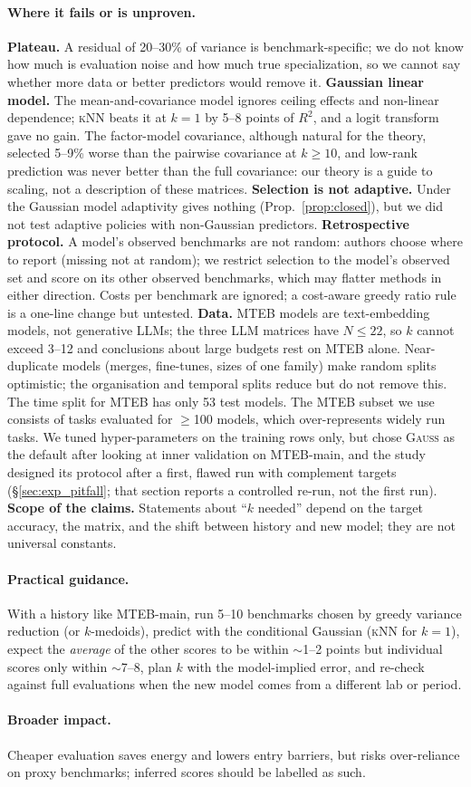 \paragraph{Where it fails or is unproven.}
\textbf{Plateau.} A residual of 20--30\% of variance is benchmark-specific; we do not know how much is evaluation noise and how much true specialization, so we cannot say whether more data or better predictors would remove it. \textbf{Gaussian linear model.} The mean-and-covariance model ignores ceiling effects and non-linear dependence; \textsc{kNN} beats it at $k=1$ by 5--8 points of $R^2$, and a logit transform gave no gain. The factor-model covariance, although natural for the theory, selected 5--9\% worse than the pairwise covariance at $k\ge10$, and low-rank prediction was never better than the full covariance: our theory is a guide to scaling, not a description of these matrices. \textbf{Selection is not adaptive.} Under the Gaussian model adaptivity gives nothing (Prop.~\ref{prop:closed}), but we did not test adaptive policies with non-Gaussian predictors. \textbf{Retrospective protocol.} A model's observed benchmarks are not random: authors choose where to report (missing not at random); we restrict selection to the model's observed set and score on its other observed benchmarks, which may flatter methods in either direction. Costs per benchmark are ignored; a cost-aware greedy ratio rule is a one-line change but untested. \textbf{Data.} MTEB models are text-embedding models, not generative LLMs; the three LLM matrices have $N\le22$, so $k$ cannot exceed 3--12 and conclusions about large budgets rest on MTEB alone. Near-duplicate models (merges, fine-tunes, sizes of one family) make random splits optimistic; the organisation and temporal splits reduce but do not remove this. The time split for MTEB has only 53 test models. The MTEB subset we use consists of tasks evaluated for $\ge$100 models, which over-represents widely run tasks. We tuned hyper-parameters on the training rows only, but chose \textsc{Gauss} as the default after looking at inner validation on MTEB-main, and the study designed its protocol after a first, flawed run with complement targets (\S\ref{sec:exp_pitfall}; that section reports a controlled re-run, not the first run). \textbf{Scope of the claims.} Statements about ``$k$ needed'' depend on the target accuracy, the matrix, and the shift between history and new model; they are not universal constants.

\paragraph{Practical guidance.} With a history like MTEB-main, run 5--10 benchmarks chosen by greedy variance reduction (or $k$-medoids), predict with the conditional Gaussian (\textsc{kNN} for $k=1$), expect the \emph{average} of the other scores to be within $\sim$1--2 points but individual scores only within $\sim$7--8, plan $k$ with the model-implied error, and re-check against full evaluations when the new model comes from a different lab or period.

\paragraph{Broader impact.} Cheaper evaluation saves energy and lowers entry barriers, but risks over-reliance on proxy benchmarks; inferred scores should be labelled as such.
